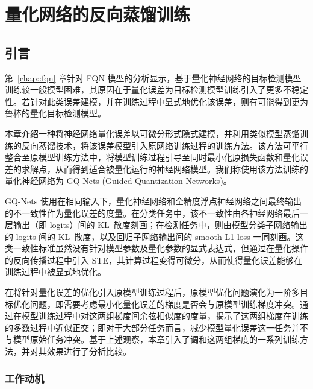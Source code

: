 \chapter{量化网络的反向蒸馏训练} \label{chap::gq_nets}
\section{引言}
第~\ref{chap::fqn} 章针对 FQN 模型的分析显示，基于量化神经网络的目标检测模型训练较一般模型困难，其原因在于量化误差为目标检测模型训练引入了更多不稳定性。若针对此类误差建模，并在训练过程中显式地优化该误差，则有可能得到更为鲁棒的量化目标检测模型。

本章介绍一种将神经网络量化误差以可微分形式隐式建模，并利用类似模型蒸馏训练的反向蒸馏技术，将该误差模型引入原网络训练过程的训练方法。该方法可平行整合至原模型训练方法中，将模型训练过程引导至同时最小化原损失函数和量化误差的求解点，从而得到适合被量化运行的神经网络模型。我们称使用该方法训练的量化神经网络为 GQ-Nets (Guided Quantization Networks)。

GQ-Nets 使用在相同输入下，量化神经网络和全精度浮点神经网络之间最终输出的不一致性作为量化误差的度量。在分类任务中，该不一致性由各神经网络最后一层输出（即 logits）间的 KL--散度刻画；在检测任务中，则由模型分类子网络输出的 logits 间的 KL--散度，以及回归子网络输出间的 smooth L1-loss  一同刻画。这类一致性标准虽然没有针对模型参数及量化参数的显式表达式，但通过在量化操作的反向传播过程中引入 STE，其计算过程变得可微分，从而使得量化误差能够在训练过程中被显式地优化。

在将针对量化误差的优化引入原模型训练过程后，原模型优化问题演化为一阶多目标优化问题，即需要考虑最小化量化误差的梯度是否会与原模型训练梯度冲突。通过在模型训练过程中对这两组梯度间余弦相似度的度量，揭示了这两组梯度在训练的多数过程中近似正交；即对于大部分任务而言，减少模型量化误差这一任务并不与模型原始任务冲突。基于上述观察，本章引入了调和这两组梯度的一系列训练方法，并对其效果进行了分析比较。
\subsection{工作动机}
